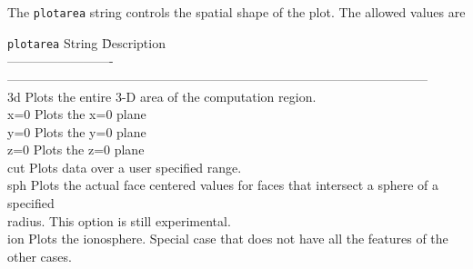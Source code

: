 The 
{\tt plotarea} string controls the spatial shape of the plot.  The allowed values
are
\begin{tabbing}
{\tt plotarea} String  \hspace{0.5in}  \= Description \\
-------------------------  \> --------------------------------------------------------------------------------------------------- \\
3d                    \> Plots the entire 3-D area of the computation region. \\
x=0                   \> Plots the x=0 plane \\
y=0                   \> Plots the y=0 plane \\
z=0                   \> Plots the z=0 plane \\
cut                   \> Plots data over a user specified range. \\
sph                   \> Plots the actual face centered values for faces that 
                          intersect a sphere of a specified  \\
                      \> \hspace{.25in} radius.  This option is still experimental. \\ 
ion                   \> Plots the ionosphere. Special case that does not have 
                          all the features of the other cases. \\
\end{tabbing}


